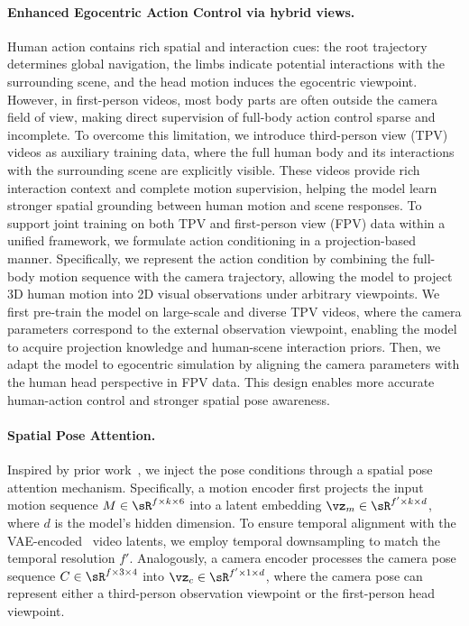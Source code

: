 \paragraph{Enhanced Egocentric Action Control via hybrid views.}
Human action contains rich spatial and interaction cues: the root trajectory determines global navigation, the limbs indicate potential interactions with the surrounding scene, and the head motion induces the egocentric viewpoint.
However, in first-person videos, most body parts are often outside the camera field of view, making direct supervision of full-body action control sparse and incomplete.
To overcome this limitation, we introduce third-person view (TPV) videos as auxiliary training data, where the full human body and its interactions with the surrounding scene are explicitly visible.
These videos provide rich interaction context and complete motion supervision, helping the model learn stronger spatial grounding between human motion and scene responses.
To support joint training on both TPV and first-person view (FPV) data within a unified framework, we formulate action conditioning in a projection-based manner.
Specifically, we represent the action condition by combining the full-body motion sequence with the camera trajectory, allowing the model to project 3D human motion into 2D visual observations under arbitrary viewpoints.
We first pre-train the model on large-scale and diverse TPV videos, where the camera parameters correspond to the external observation viewpoint, enabling the model to acquire projection knowledge and human-scene interaction priors.
Then, we adapt the model to egocentric simulation by aligning the camera parameters with the human head perspective in FPV data.
This design enables more accurate human-action control and stronger spatial pose awareness.

\paragraph{Spatial Pose Attention.} 
Inspired by prior work~\cite{fu20243dtrajmaster, li2025adaviewplanner}, we inject the pose conditions through a spatial pose attention mechanism. 
Specifically, a motion encoder first projects the input motion sequence $M \in \sR^{f \times k \times 6}$ into a latent embedding $\vz_m \in \sR^{f' \times k \times d}$, where $d$ is the model's hidden dimension. To ensure temporal alignment with the VAE-encoded~\cite{kingma2013auto} video latents, we employ temporal downsampling to match the temporal resolution $f'$. Analogously, a camera encoder processes the camera pose sequence $C \in \sR^{f \times 3 \times 4}$ into $\vz_c \in \sR^{f' \times 1 \times d}$, where the camera pose can represent either a third-person observation viewpoint or the first-person head viewpoint.

